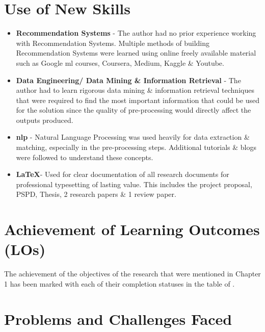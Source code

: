 \section{Use of New Skills}
\begin{itemize}
\item \textbf{Recommendation Systems} - The author had no prior experience working with Recommendation Systems. Multiple methods of building Recommendation Systems were learned using online freely available  material such as Google \gls{ml} courses, Coursera, Medium, Kaggle \& Youtube.
\item \textbf{Data Engineering/ Data Mining \& Information Retrieval} - The author had to learn rigorous data mining \& information retrieval techniques that were required to find the most important information that could be used for the solution since the quality of pre-processing would directly affect the outputs produced.
\item \textbf{\gls{nlp}} - Natural Language Processing was used heavily for data extraction \& matching, especially in the pre-processing steps. Additional tutorials \& blogs were followed to understand these concepts.
\item \textbf{\LaTeX }- Used for clear documentation of all research documents for professional typesetting of lasting value. This includes the project proposal, PSPD, Thesis, 2 research papers \& 1 review paper.
\end{itemize}

\section{Achievement of Learning Outcomes (LOs)}
The achievement of the objectives of the research that were mentioned in Chapter 1 has been marked with each of their completion statuses in the  table of \textit{}.


\section{Problems and Challenges Faced}

